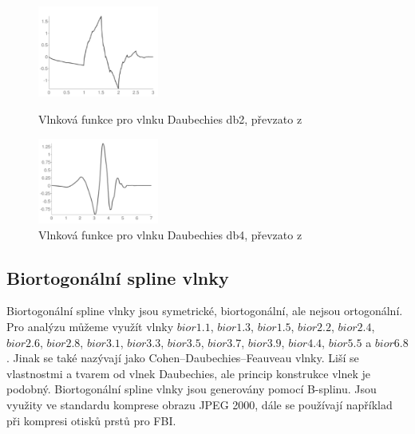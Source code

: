 \begin{figure}[!htbp]
  \begin{minipage}[b]{0.5\linewidth}
    \centering
    \includegraphics[width=150px]{obrazky-figures/db2wavelet.PNG}
    \caption{Vlnková funkce pro vlnku Daubechies db2, převzato z \cite{PyWaveletsBrowser}}
  \end{minipage}
  \hspace{0.5cm}
  \begin{minipage}[b]{0.5\linewidth}
    \centering
    \includegraphics[width=150px]{obrazky-figures/db4wavelet.PNG}
    \caption{Vlnková funkce pro vlnku Daubechies db4, převzato z \cite{PyWaveletsBrowser}}
  \end{minipage}
\end{figure}
    
\subsection{Biortogonální spline vlnky}
Biortogonální spline vlnky jsou symetrické, biortogonální, ale nejsou ortogonální. Pro analýzu můžeme využít vlnky $bior1.1$, $bior1.3$, $bior1.5$, $bior2.2$, $bior2.4$, $bior2.6$, $bior2.8$, $bior 3.1$, $bior3.3$, $bior3.5$, $bior3.7$, $bior3.9$, $bior4.4$, $bior5.5$ a $bior6.8$.\cite{PyWaveletsBrowser} Jinak se také nazývají jako Cohen–Daubechies–Feauveau vlnky. Liší se vlastnostmi a tvarem od vlnek Daubechies, ale princip konstrukce vlnek je podobný. Biortogonální spline vlnky jsou generovány pomocí B-splinu. \cite{GeneralizedBiorthogonalDaubechiesWavelets} Jsou využity ve standardu komprese obrazu JPEG 2000, dále se používají například při kompresi otisků prstů pro FBI. 


